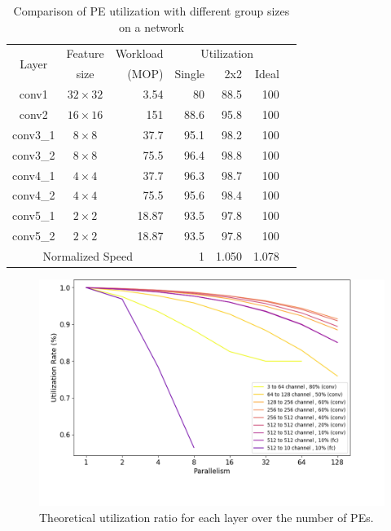 \begin{table}[tb]
  \centering
  \caption{Comparison of PE utilization with different group sizes on a network}
    \begin{tabular}{|c|c|r|r|r|r|r|}
    \hline
    \multirow{2}[4]{*}{Layer} & Feature & Workload & \multicolumn{3}{c|}{Utilization} \\
\cline{4-6}          & size & (MOP) & Single & 2x2 & Ideal\\
    \hline
    conv1 & $32\times 32$ & 3.54 & 80    & 88.5  & 100\\
    \hline
    conv2 & $16\times 16$ & 151 & 88.6  & 95.8  & 100\\
    \hline
    conv3\_1 & $8\times 8$   & 37.7 & 95.1  & 98.2  & 100\\
    \hline
    conv3\_2 & $8\times 8$   & 75.5 & 96.4  & 98.8  & 100\\
    \hline
    conv4\_1 & $4\times 4$   & 37.7 & 96.3  & 98.7  & 100\\
    \hline
    conv4\_2 & $4\times 4$   & 75.5 & 95.6  & 98.4  & 100\\
    \hline
    conv5\_1 & $2\times 2$   & 18.87 & 93.5  & 97.8  & 100\\
    \hline
    conv5\_2 & $2\times 2$   & 18.87 & 93.5  & 97.8  & 100\\
    \hline
    \multicolumn{3}{|c|}{Normalized Speed} & 1     & 1.050 & 1.078 \\
    \hline
    \end{tabular}
  \label{tab:hw_util}
\end{table}

\begin{figure}[tb]
  \centering
  \includegraphics[width=1.0\columnwidth]{figures/util_real.png}
  \caption{Theoretical utilization ratio for each layer over the number of PEs.}
  \label{fig:util_real}
\end{figure}

